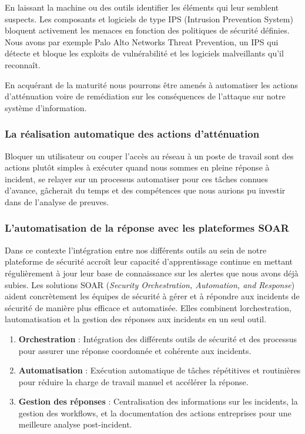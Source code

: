 \documentclass[
  11pt,
  a4paper,
  krantz2,
  11pt,
  oneside]{krantz}
\begin{document}
En laissant la machine ou des outils identifier les éléments qui leur semblent suspects. Les composants et logiciels de type IPS (Intrusion Prevention System) bloquent activement les menaces en fonction des politiques de sécurité définies. Nous avons par exemple Palo Alto Networks Threat Prevention, un IPS qui détecte et bloque les exploits de vulnérabilité et les logiciels malveillants qu'il reconnaît.

En acquérant de la maturité nous pourrons être amenés à automatiser les actions d'atténuation voire de remédiation sur les conséquences de l'attaque sur notre système d'information.

\subsubsection{La réalisation automatique des actions d'atténuation}\label{la-ruxe9alisation-automatique-des-actions-dattuxe9nuation}

Bloquer un utilisateur ou couper l'accès au réseau à un poste de travail sont des actions plutôt simples à exécuter quand nous sommes en pleine réponse à incident, se relayer sur un processus automatiser pour ces tâches connues d'avance, gâcherait du temps et des compétences que nous aurions pu investir dans de l'analyse de preuves.

\subsubsection{L'automatisation de la réponse avec les plateformes SOAR}\label{lautomatisation-de-la-ruxe9ponse-avec-les-plateformes-soar}

Dans ce contexte l'intégration entre nos différents outils au sein de notre plateforme de sécurité accroît leur capacité d'apprentissage continue en mettant régulièrement à jour leur base de connaissance sur les alertes que nous avons déjà subies. Les solutions SOAR (\emph{Security Orchestration, Automation, and Response}) aident concrètement les équipes de sécurité à gérer et à répondre aux incidents de sécurité de manière plus efficace et automatisée. Elles combinent l\textquotesingle orchestration, l\textquotesingle automatisation et la gestion des réponses aux incidents en un seul outil.

\begin{enumerate}
\def\labelenumi{\roman{enumi}.}
\item
  \textbf{Orchestration} : Intégration des différents outils de sécurité et des processus pour assurer une réponse coordonnée et cohérente aux incidents.
\item
  \textbf{Automatisation} : Exécution automatique de tâches répétitives et routinières pour réduire la charge de travail manuel et accélérer la réponse.
\item
  \textbf{Gestion des réponses} : Centralisation des informations sur les incidents, la gestion des workflows, et la documentation des actions entreprises pour une meilleure analyse post-incident.
\end{enumerate}
\end{document}
